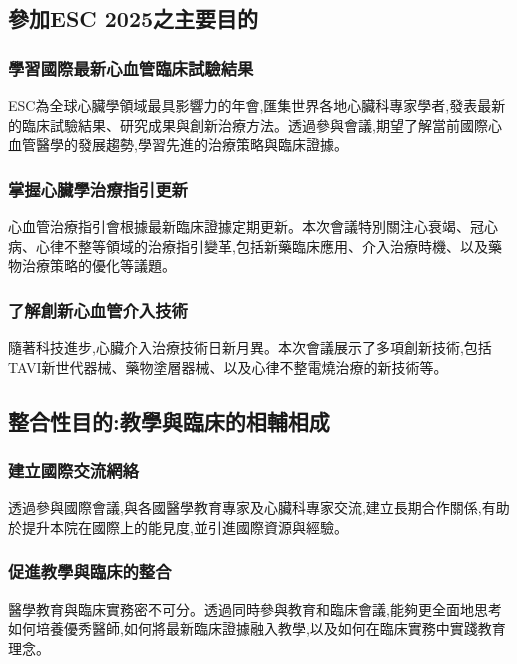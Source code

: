 \documentclass[12pt,a4paper]{article}
\begin{document}
\subsection{參加ESC 2025之主要目的}

\subsubsection{學習國際最新心血管臨床試驗結果}

ESC為全球心臟學領域最具影響力的年會,匯集世界各地心臟科專家學者,發表最新的臨床試驗結果、研究成果與創新治療方法。透過參與會議,期望了解當前國際心血管醫學的發展趨勢,學習先進的治療策略與臨床證據。

\subsubsection{掌握心臟學治療指引更新}

心血管治療指引會根據最新臨床證據定期更新。本次會議特別關注心衰竭、冠心病、心律不整等領域的治療指引變革,包括新藥臨床應用、介入治療時機、以及藥物治療策略的優化等議題。

\subsubsection{了解創新心血管介入技術}

隨著科技進步,心臟介入治療技術日新月異。本次會議展示了多項創新技術,包括TAVI新世代器械、藥物塗層器械、以及心律不整電燒治療的新技術等。

\subsection{整合性目的:教學與臨床的相輔相成}

\subsubsection{建立國際交流網絡}

透過參與國際會議,與各國醫學教育專家及心臟科專家交流,建立長期合作關係,有助於提升本院在國際上的能見度,並引進國際資源與經驗。

\subsubsection{促進教學與臨床的整合}

醫學教育與臨床實務密不可分。透過同時參與教育和臨床會議,能夠更全面地思考如何培養優秀醫師,如何將最新臨床證據融入教學,以及如何在臨床實務中實踐教育理念。
\end{document}
